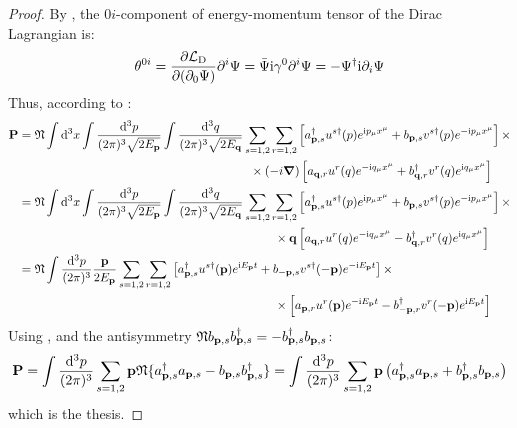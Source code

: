 \begin{proofbox}
  \begin{proof}
    By , the $ 0i $-component of energy-momentum tensor of the Dirac Lagrangian is:
    \begin{equation*}
      \theta^{0i} = \frac{\partial \mathcal{L}_\text{D}}{\partial (\partial_0 \Psi)} \partial^i \Psi = \bar{\Psi} \mathrm{i} \gamma^0 \partial^i \Psi = - \Psi^\dagger \mathrm{i} \partial_i \Psi
    \end{equation*}
    Thus, according to :
    \begin{equation*}
      \begin{split}
        \mathbf{P}
        &= \mathfrak{N} \int \mathrm{d}^3x \int \frac{\mathrm{d}^3p}{(2\pi)^3 \sqrt{2E_{\mathbf{p}}}} \int \frac{\mathrm{d}^3q}{(2\pi)^3 \sqrt{2E_{\mathbf{q}}}} \sum_{s = 1,2} \sum_{r = 1,2} \left[ a_{\mathbf{p},s}^\dagger u^{s\dagger}(p) e^{\mathrm{i} p_\mu x^\mu} + b_{\mathbf{p},s} v^{s\dagger}(p) e^{-\mathrm{i} p_\mu x^\mu} \right] \times \\
        & \qquad \qquad \qquad \qquad \qquad \qquad \qquad \qquad \qquad \quad \times (-i \boldsymbol{\nabla}) \left[ a_{\mathbf{q},r} u^r(q) e^{-\mathrm{i} q_\mu x^\mu} + b_{\mathbf{q},r}^\dagger v^r(q) e^{\mathrm{i} q_\mu x^\mu} \right] \\
        &= \mathfrak{N} \int \mathrm{d}^3x \int \frac{\mathrm{d}^3p}{(2\pi)^3 \sqrt{2E_{\mathbf{p}}}} \int \frac{\mathrm{d}^3q}{(2\pi)^3 \sqrt{2E_{\mathbf{q}}}} \sum_{s = 1,2} \sum_{r = 1,2} \left[ a_{\mathbf{p},s}^\dagger u^{s\dagger}(p) e^{\mathrm{i} p_\mu x^\mu} + b_{\mathbf{p},s} v^{s\dagger}(p) e^{-\mathrm{i} p_\mu x^\mu} \right] \times \\
        & \qquad \qquad \qquad \qquad \qquad \qquad \qquad \qquad \qquad \qquad \quad \times \mathbf{q} \left[ a_{\mathbf{q},r} u^r(q) e^{-\mathrm{i} q_\mu x^\mu} - b_{\mathbf{q},r}^\dagger v^r(q) e^{\mathrm{i} q_\mu x^\mu} \right] \\
        &= \mathfrak{N} \int \frac{\mathrm{d}^3p}{(2\pi)^3} \frac{\mathbf{p}}{2E_{\mathbf{p}}} \sum_{s = 1,2} \sum_{r = 1,2} \left[ a_{\mathbf{p},s}^\dagger u^{s\dagger}(\mathbf{p}) e^{\mathrm{i} E_{\mathbf{p}} t} + b_{-\mathbf{p},s} v^{s\dagger}(-\mathbf{p}) e^{-\mathrm{i} E_{\mathbf{p}} t} \right] \times \\
        & \qquad \qquad \qquad \qquad \qquad \qquad \qquad \qquad \qquad \qquad \quad \times \left[ a_{\mathbf{p},r} u^r(\mathbf{p}) e^{-\mathrm{i} E_{\mathbf{p}} t} - b_{-\mathbf{p},r}^\dagger v^r(-\mathbf{p}) e^{\mathrm{i} E_{\mathbf{p}} t} \right]
      \end{split}
    \end{equation*}
    Using ,  and the antisymmetry $ \mathfrak{N} b_{\mathbf{p},s} b_{\mathbf{p},s}^\dagger = - b_{\mathbf{p},s}^\dagger b_{\mathbf{p},s} $:
    \begin{equation*}
      \mathbf{P} = \int \frac{\mathrm{d}^3p}{(2\pi)^3} \sum_{s = 1,2} \mathbf{p} \mathfrak{N}\{a_{\mathbf{p},s}^\dagger a_{\mathbf{p},s} - b_{\mathbf{p},s} b_{\mathbf{p},s}^\dagger\} = \int \frac{\mathrm{d}^3p}{(2\pi)^3} \sum_{s = 1,2} \mathbf{p} \left( a_{\mathbf{p},s}^\dagger a_{\mathbf{p},s} + b_{\mathbf{p},s}^\dagger b_{\mathbf{p},s} \right)
    \end{equation*}
    which is the thesis.
  \end{proof}
\end{proofbox}


